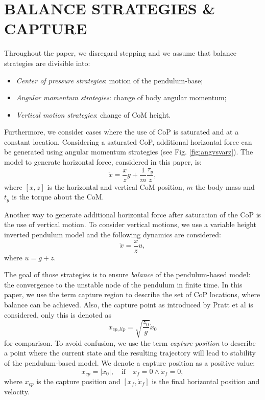 \documentclass[letterpaper, 10 pt, conference]{ieeeconf}  %
\begin{document}
\section{BALANCE STRATEGIES \& CAPTURE}\label{sec:models}
Throughout the paper, we disregard stepping and we assume that balance strategies are divisible into:
\begin{itemize}
	\item \textit{Center of pressure strategies}: motion of the pendulum-base;
	\item \textit{Angular momentum strategies}: change of body angular momentum;
	\item \textit{Vertical motion strategies}: change of CoM height.
\end{itemize}
Furthermore, we consider cases where the use of CoP is saturated and at a constant location. Considering a saturated CoP, additional horizontal force can be generated using angular momentum strategies (see Fig. \ref{fig:angvsvarz}). The model to generate horizontal force, considered in this paper, is:
\begin{equation}
	\ddot{x} =\frac{x}{z}g + \frac{1}{m}\frac{\tau_y}{z},
	\label{eq:ang}
\end{equation}
where $[x,z]$ is the horizontal and vertical CoM position, $m$ the body mass and $t_y$ is the torque about the CoM.

Another way to generate additional horizontal force after saturation of the CoP is the use of vertical motion. To consider vertical motions, we use a variable height inverted pendulum model and the following dynamics are considered:
\begin{equation}
	\ddot{x} = \frac{x}{z}u,
	\label{eq:height}
\end{equation}
where $u=g+\ddot{z}$.

The goal of those strategies is to ensure \textit{balance} of the pendulum-based model: the convergence to the unstable node of the pendulum in finite time. In this paper, we use the term capture region \cite{pratt2006capture} to describe the set of CoP locations, where balance can be achieved. Also, the capture point as introduced by Pratt et al is considered, only this is denoted as
\begin{equation}
	x_{cp,lip} = \sqrt{\frac{z_0}{g}}\dot{x}_0
	\label{eq:xcplip}
\end{equation}
for comparison. To avoid confusion, we use the term \textit{capture position} to describe a point where the current state and the resulting trajectory will lead to stability of the pendulum-based model. We denote a capture position as a positive value:
\begin{equation}
	x_{cp}= |x_0|,\quad \text{if} \quad x_f=0 \wedge \dot{x}_f=0,
	\label{eq:xcp}
\end{equation}
where $x_{cp}$ is the capture position and $[x_f, \dot{x}_f]$ is the final horizontal position and velocity.
\end{document}
